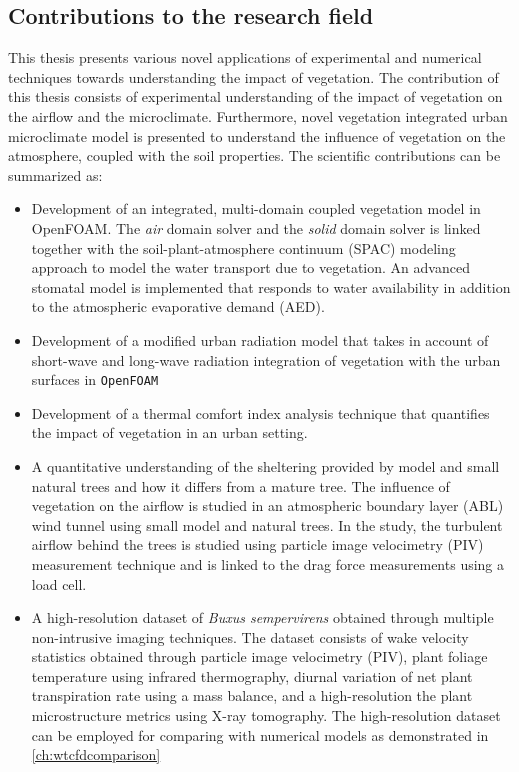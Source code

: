 \subsection{Contributions to the research field}

This thesis presents various novel applications of experimental and numerical techniques towards understanding the impact of vegetation. The contribution of this thesis consists of experimental understanding of the impact of vegetation on the airflow and the microclimate. Furthermore, novel vegetation integrated urban microclimate model is presented to understand the influence of vegetation on the atmosphere, coupled with the soil properties. The scientific contributions can be summarized as:

\begin{itemize}
	\item Development of an integrated, multi-domain coupled vegetation model in OpenFOAM. The \textit{air} domain solver and the \textit{solid} domain solver is linked together with the soil-plant-atmosphere continuum (SPAC) modeling approach to model the water transport due to vegetation. An advanced stomatal model is implemented that responds to water availability in addition to the atmospheric evaporative demand (AED).
	
	\item Development of a modified urban radiation model that takes in account of short-wave and long-wave radiation integration of vegetation with the urban surfaces in \texttt{OpenFOAM}
	
	\item Development of a thermal comfort index analysis technique that quantifies the impact of vegetation in an urban setting.

	\item A quantitative understanding of the sheltering provided by model and small natural trees and how it differs from a mature tree. The influence of vegetation on the airflow is studied in an atmospheric boundary layer (ABL) wind tunnel using small model and natural trees. In the study, the turbulent airflow behind the trees is studied using particle image velocimetry (PIV) measurement technique and is linked to the drag force measurements using a load cell. 
	
	\item A high-resolution dataset of \textit{Buxus sempervirens} obtained through multiple non-intrusive imaging techniques. The dataset consists of wake velocity statistics obtained through particle image velocimetry (PIV), plant foliage temperature using infrared thermography, diurnal variation of net plant transpiration rate using a mass balance, and a high-resolution the plant microstructure metrics using  X-ray tomography. The high-resolution dataset can be employed for comparing with numerical models as demonstrated in \cref{ch:wtcfdcomparison}


\end{itemize}
